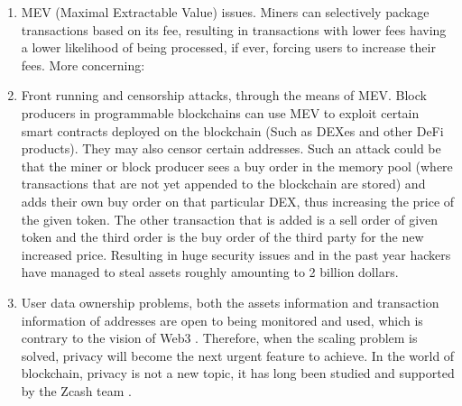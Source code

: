 \begin{enumerate}
    \item MEV (Maximal Extractable Value) issues. Miners can selectively package transactions based on its fee, resulting in transactions with lower fees having a lower likelihood of being processed, if ever, forcing users to increase their fees. More concerning:
    \item Front running and censorship attacks, through the means of MEV. Block producers in programmable blockchains can use MEV to exploit certain smart contracts deployed on the blockchain (Such as DEXes and other DeFi products). They may also censor certain addresses. Such an attack could be that the miner or block producer sees a buy order in the memory pool (where transactions that are not yet appended to the blockchain are stored) and adds their own buy order on that particular DEX, thus increasing the price of the given token. The other transaction that is added is a sell order of given token and the third order is the buy order of the third party for the new increased price. Resulting in huge security issues and in the past year hackers have managed to steal assets roughly amounting to 2 billion dollars.
    \item User data ownership problems, both the assets information and transaction information of addresses are open to being monitored and used, which is contrary to the vision of Web3 \cite{website:Web3}. Therefore, when the scaling problem is solved, privacy will become the next urgent feature to achieve. In the world of blockchain, privacy is not a new topic, it has long been studied and supported by the Zcash team \cite{website:Zcash}.
\end{enumerate}





